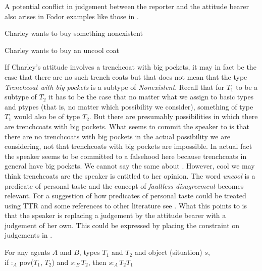 A potential conflict in judgement between the reporter and
the attitude bearer also arises in Fodor examples like those in
\nexteg{}.
\begin{ex} 
\begin{subex} 
 
\item Charley wants to buy something nonexistent 
 
\item Charley wants to buy an uncool coat 
 
\end{subex} 
   
\end{ex} 
If Charley's attitude involves a trenchcoat with big pockets, it may
in fact be the case that there are no such trench coats but that does
not mean that the type \textit{Trenchcoat with big pockets} is a
subtype of \textit{Nonexistent}.  Recall that for $T_1$ to be a
subtype of $T_2$ it has to be the case that no matter what we assign
to basic types and ptypes (that is, no matter which possibility we
consider), something of type $T_1$ would also be of
type $T_2$.  But there are presumably possibilities in which there are
trenchcoats with big pockets.  What  seems to commit the
speaker to is that there are no trenchcoats with big pockets in the
actual possibility we are considering, not that trenchcoats with big
pockets are impossible.  In actual fact the speaker seems to be
committed to a falsehood here because trenchcoats in general have big
pockets.  We cannot say the same about .  However, cool we
may think trenchcoats are the speaker is entitled to her opinion.  The
word \textit{uncool} is a predicate of personal taste and the concept
of \textit{faultless disagreement} \citep{Koelbel2004} becomes
relevant.  For a suggestion of how predicates of personal taste
could be treated using TTR and some references to other literature see
\cite{Cooper2015a}.  What this points to is that the speaker is
replacing a judgement by the attitude bearer with a judgement of her
own.  This could be expressed by placing the constraint on judgements in \nexteg{}.
\begin{ex} 

For any agents $A$ and $B$, types $T_1$ and $T_2$ and object
(situation) $s$, \\
\hspace*{2em}if :$_A$
pov($T_1$, $T_2$) and $s:_BT_2$, then $s:_AT_2$\fbox{\d{$\wedge$}}$T_1$
 
\end{ex} 
